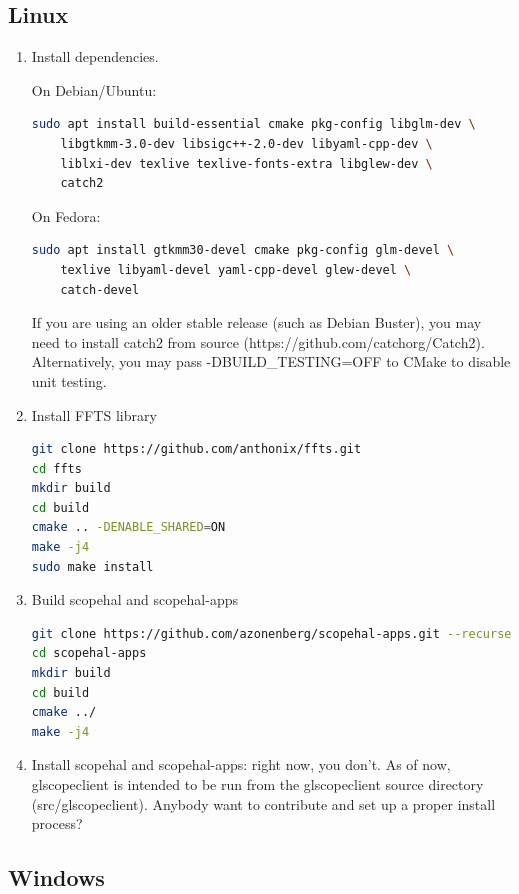 \subsection{Linux}
\begin{enumerate}

\item Install dependencies.

On Debian/Ubuntu:
\begin{lstlisting}[language=sh]
sudo apt install build-essential cmake pkg-config libglm-dev \
	libgtkmm-3.0-dev libsigc++-2.0-dev libyaml-cpp-dev \
	liblxi-dev texlive texlive-fonts-extra libglew-dev \
	catch2
\end{lstlisting}

On Fedora:
\begin{lstlisting}[language=sh]
sudo apt install gtkmm30-devel cmake pkg-config glm-devel \
	texlive libyaml-devel yaml-cpp-devel glew-devel \
	catch-devel
\end{lstlisting}

If you are using an older stable release (such as Debian Buster), you may need to install catch2 from source
(https://github.com/catchorg/Catch2). Alternatively, you may pass -DBUILD\_TESTING=OFF to CMake to disable unit testing.

\item Install FFTS library
\begin{lstlisting}[language=sh]
git clone https://github.com/anthonix/ffts.git
cd ffts
mkdir build
cd build
cmake .. -DENABLE_SHARED=ON
make -j4
sudo make install
\end{lstlisting}

\item Build scopehal and scopehal-apps
\begin{lstlisting}[language=sh]
git clone https://github.com/azonenberg/scopehal-apps.git --recurse-submodules
cd scopehal-apps
mkdir build
cd build
cmake ../
make -j4
\end{lstlisting}

\item Install scopehal and scopehal-apps: right now, you don't. As of now, glscopeclient is intended to be run from the
glscopeclient source directory (src/glscopeclient). Anybody want to contribute and set up a proper install process?

\end{enumerate}

\subsection{Windows}

